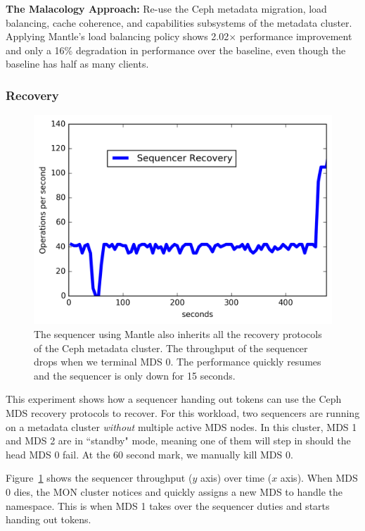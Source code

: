 \documentclass[preprint]{sigplanconf-eurosys}
\begin{document}
\textbf{The Malacology Approach:} Re-use the Ceph metadata migration, load
balancing, cache coherence, and capabilities subsystems of the metadata
cluster. Applying Mantle's load balancing policy shows 2.02\(\times\)
performance improvement and only a 16\% degradation in performance over the
baseline, even though the baseline has half as many clients.

\subsubsection{Recovery}

\begin{figure}[t]
\centering
\includegraphics{figures/recovery-seq-thruput.png}
\caption{The sequencer using Mantle also inherits all the recovery protocols of
the Ceph metadata cluster. The throughput of the sequencer drops when we
terminal MDS 0. The performance quickly resumes and the sequencer is only down
for 15 seconds.}
\label{fig:recovery-seq-thruput}
\end{figure}

This experiment shows how a sequencer handing out tokens can use the Ceph MDS
recovery protocols to recover. For this workload, two sequencers are running on
a metadata cluster {\it without} multiple active MDS nodes. In this cluster,
MDS 1 and MDS 2 are in ``standby" mode, meaning one of them will step in should
the head MDS 0 fail. At the 60 second mark, we manually kill MDS 0. 

Figure~\ref{fig:recovery-seq-thruput} shows the sequencer throughput (\(y\)
axis) over time (\(x\) axis). When MDS 0 dies, the MON cluster notices and
quickly assigns a new MDS to handle the namespace. This is when MDS 1 takes
over the sequencer duties and starts handing out tokens.
\end{document}
